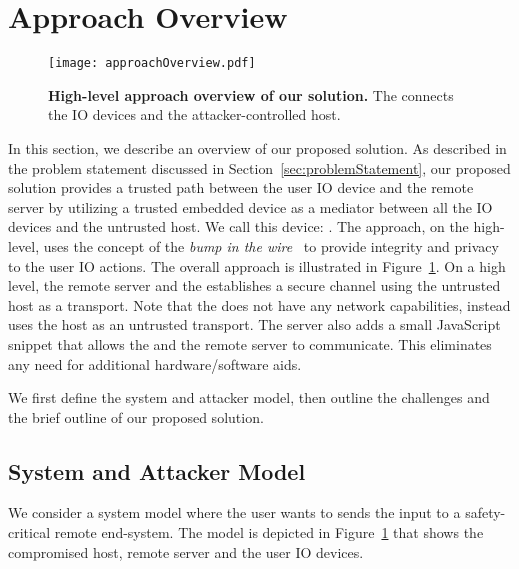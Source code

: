 \section{Approach Overview}
\label{sec:approach}


\begin{figure}[t]
\centering
\texttt{[image: approachOverview.pdf]}
\caption{\textbf{High-level approach overview of our solution.}  The \device connects the IO devices and the attacker-controlled host. }
\label{fig:approachOverview}
\centering
\end{figure}


In this section, we describe an overview of our proposed solution. As described in the problem statement discussed in Section~\ref{sec:problemStatement}, our proposed solution provides a trusted path between the user IO device and the remote server by utilizing a trusted embedded device as a mediator between all the IO devices and the untrusted host. We call this device: \device. The approach, on the high-level, uses the concept of the \emph{bump in the wire}~\cite{McCPerRei2006} to provide integrity and privacy to the user IO actions. The overall approach is illustrated in Figure~\ref{fig:approachOverview}. On a high level, the remote server and the \device establishes a secure channel using the untrusted host as a transport. Note that the \device does not have any network capabilities, instead uses the host as an untrusted transport. The server also adds a small JavaScript snippet that allows the \device and the remote server to communicate. This eliminates any need for additional hardware/software aids.

We first define the system and attacker model, then outline the challenges and the brief outline of our proposed solution.



\subsection{System and Attacker Model}

We consider a system model where the user wants to sends the input to a safety-critical remote end-system. The model is depicted in Figure~\ref{fig:approachOverview} that shows the compromised host, remote server and the user IO devices. 

